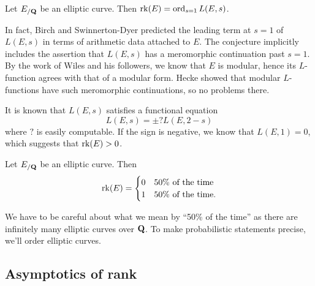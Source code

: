 \begin{conjecture}
Let $E_{/\mathbf{Q}}$ be an elliptic curve. Then $\operatorname{rk}(E)=\operatorname{ord}_{s=1} L(E,s)$. 
\end{conjecture}

In fact, Birch and Swinnerton-Dyer predicted the leading term at $s=1$ of 
$L(E,s)$ in terms of arithmetic data attached to $E$. The conjecture implicitly 
includes the assertion that $L(E,s)$ has a meromorphic continuation past $s=1$. 
By the work of Wiles and his followers, we know that $E$ is modular, hence its 
$L$-function agrees with that of a modular form. Hecke showed that modular 
$L$-functions have such meromorphic continuations, so no problems there. 

It is known that $L(E,s)$ satisfies a functional equation 
\[
  L(E,s) = \pm ? L(E,2-s) 
\]
where $?$ is easily computable. If the sign is negative, we know that 
$L(E,1)=0$, which suggests that $\operatorname{rk}(E)>0$.

\begin{conjecture}
Let $E_{/\mathbf{Q}}$ be an elliptic curve. Then 
\[
  \operatorname{rk}(E) = \begin{cases} 0 & \text{50\% of the time} \\ 1 & \text{50\% of the time.} \end{cases}
\]
\end{conjecture}

We have to be careful about what we mean by ``50\% of the time'' as there are 
infinitely many elliptic curves over $\mathbf{Q}$. To make probabilistic statements 
precise, we'll order elliptic curves. 





\subsection{Asymptotics of rank}

